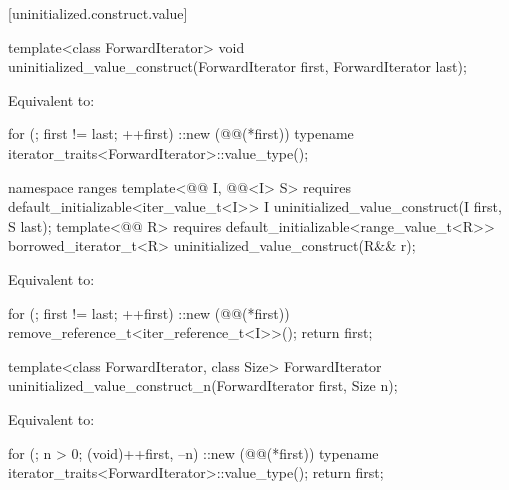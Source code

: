 [uninitialized.construct.value]{}

%
\begin{itemdecl}
template<class ForwardIterator>
  void uninitialized_value_construct(ForwardIterator first, ForwardIterator last);
\end{itemdecl}

\begin{itemdescr}
\pnum
\effects
Equivalent to:
\begin{codeblock}
for (; first != last; ++first)
  ::new (@@(*first))
    typename iterator_traits<ForwardIterator>::value_type();
\end{codeblock}
\end{itemdescr}

%
\begin{itemdecl}
namespace ranges {
  template<@@ I, @@<I> S>
      requires default_initializable<iter_value_t<I>>
    I uninitialized_value_construct(I first, S last);
  template<@@ R>
      requires default_initializable<range_value_t<R>>
    borrowed_iterator_t<R> uninitialized_value_construct(R&& r);
}
\end{itemdecl}

\begin{itemdescr}
\pnum
\effects
Equivalent to:
\begin{codeblock}
for (; first != last; ++first)
  ::new (@@(*first)) remove_reference_t<iter_reference_t<I>>();
return first;
\end{codeblock}
\end{itemdescr}

%
\begin{itemdecl}
template<class ForwardIterator, class Size>
  ForwardIterator uninitialized_value_construct_n(ForwardIterator first, Size n);
\end{itemdecl}

\begin{itemdescr}
\pnum
\effects
Equivalent to:
\begin{codeblock}
for (; n > 0; (void)++first, --n)
  ::new (@@(*first))
    typename iterator_traits<ForwardIterator>::value_type();
return first;
\end{codeblock}
\end{itemdescr}

